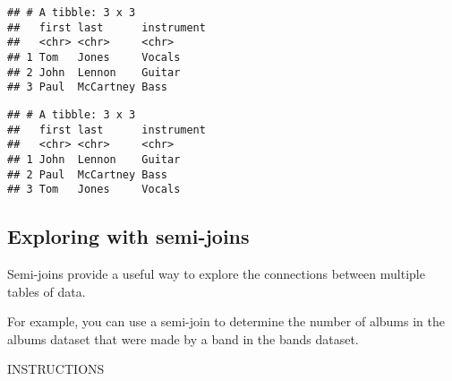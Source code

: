 \documentclass[]{article}
\newenvironment{Shaded}{\begin{snugshade}}{\end{snugshade}}
\newcommand{\KeywordTok}[1]{\textcolor[rgb]{0.13,0.29,0.53}{\textbf{#1}}}
\newcommand{\DataTypeTok}[1]{\textcolor[rgb]{0.13,0.29,0.53}{#1}}
\newcommand{\StringTok}[1]{\textcolor[rgb]{0.31,0.60,0.02}{#1}}
\newcommand{\CommentTok}[1]{\textcolor[rgb]{0.56,0.35,0.01}{\textit{#1}}}
\newcommand{\OperatorTok}[1]{\textcolor[rgb]{0.81,0.36,0.00}{\textbf{#1}}}
\newcommand{\NormalTok}[1]{#1}
\begin{document}
\begin{Shaded}
\end{Shaded}

\begin{verbatim}
## # A tibble: 3 x 3
##   first last      instrument
##   <chr> <chr>     <chr>     
## 1 Tom   Jones     Vocals    
## 2 John  Lennon    Guitar    
## 3 Paul  McCartney Bass
\end{verbatim}

\begin{Shaded}
\end{Shaded}

\begin{verbatim}
## # A tibble: 3 x 3
##   first last      instrument
##   <chr> <chr>     <chr>     
## 1 John  Lennon    Guitar    
## 2 Paul  McCartney Bass      
## 3 Tom   Jones     Vocals
\end{verbatim}

\subsection{Exploring with semi-joins}\label{exploring-with-semi-joins}

Semi-joins provide a useful way to explore the connections between
multiple tables of data.

For example, you can use a semi-join to determine the number of albums
in the albums dataset that were made by a band in the bands dataset.

INSTRUCTIONS
\end{document}
